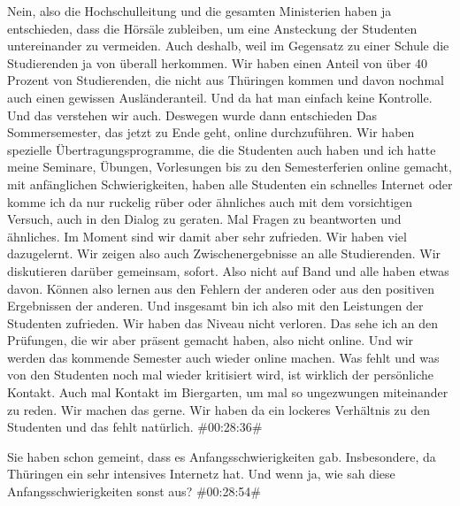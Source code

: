 \begin{description}
\Andre Nein, also die Hochschulleitung und die gesamten Ministerien haben ja entschieden, dass die Hörsäle zubleiben, um eine Ansteckung der Studenten untereinander zu vermeiden. Auch deshalb, weil im Gegensatz zu einer Schule die Studierenden ja von überall herkommen. Wir haben einen Anteil von über 40 Prozent von Studierenden, die nicht aus Thüringen kommen und davon nochmal auch einen gewissen Ausländeranteil. Und da hat man einfach keine Kontrolle. Und das verstehen wir auch. Deswegen wurde dann entschieden Das Sommersemester, das jetzt zu Ende geht, online durchzuführen. Wir haben spezielle Übertragungsprogramme, die die Studenten auch haben und ich hatte meine Seminare, Übungen, Vorlesungen bis zu den Semesterferien online gemacht, mit anfänglichen Schwierigkeiten, haben alle Studenten ein schnelles Internet oder komme ich da nur ruckelig rüber oder ähnliches auch mit dem vorsichtigen Versuch, auch in den Dialog zu geraten. Mal Fragen zu beantworten und ähnliches. Im Moment sind wir damit aber sehr zufrieden. Wir haben viel dazugelernt. Wir zeigen also auch Zwischenergebnisse an alle Studierenden. Wir diskutieren darüber gemeinsam, sofort. Also nicht auf Band und alle haben etwas davon. Können also lernen aus den Fehlern der anderen oder aus den positiven Ergebnissen der anderen. Und insgesamt bin ich also mit den Leistungen der Studenten zufrieden. Wir haben das Niveau nicht verloren. Das sehe ich an den Prüfungen, die wir aber präsent gemacht haben, also nicht online. Und wir werden das kommende Semester auch wieder online machen. Was fehlt und was von den Studenten noch mal wieder kritisiert wird, ist wirklich der persönliche Kontakt. Auch mal Kontakt im Biergarten, um mal so ungezwungen miteinander zu reden. Wir machen das gerne. Wir haben da ein lockeres Verhältnis zu den Studenten und das fehlt natürlich. \#00:28:36\#

\Fabian Sie haben schon gemeint, dass es Anfangsschwierigkeiten gab. Insbesondere, da Thüringen ein sehr intensives Internetz hat. Und wenn ja, wie sah diese Anfangsschwierigkeiten sonst aus? \#00:28:54\#


\end{description}
